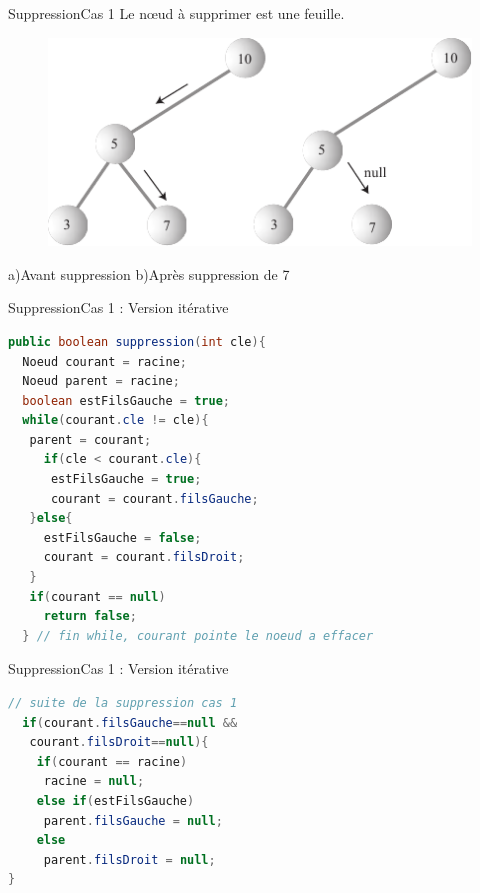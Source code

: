 \documentclass[12pt,a4paper]{beamer}
\begin{document}
\begin{frame}{Suppression}{Cas 1}
Le n\oe ud à supprimer est une feuille.
\begin{figure}
\includegraphics[scale=1]{figs/del1_tree}
\end{figure}
\hspace{3em}a)Avant suppression  \hspace{1em}  b)Après suppression de 7
\end{frame}
\begin{frame}[fragile]{Suppression}{Cas 1 : Version itérative}
\begin{lstlisting}[language=Java]
public boolean suppression(int cle){
  Noeud courant = racine;
  Noeud parent = racine;
  boolean estFilsGauche = true;
  while(courant.cle != cle){
   parent = courant;
     if(cle < courant.cle){
      estFilsGauche = true;
      courant = courant.filsGauche;
   }else{
     estFilsGauche = false;
     courant = courant.filsDroit;
   }
   if(courant == null)
     return false;
  } // fin while, courant pointe le noeud a effacer
\end{lstlisting}
\end{frame}


\begin{frame}[fragile]{Suppression}{Cas 1 : Version itérative}
\begin{lstlisting}[language=Java]
// suite de la suppression cas 1
  if(courant.filsGauche==null &&
   courant.filsDroit==null){
    if(courant == racine)
     racine = null;
    else if(estFilsGauche)
     parent.filsGauche = null;
    else
     parent.filsDroit = null;
}
\end{lstlisting}
\end{frame}
\end{document}
